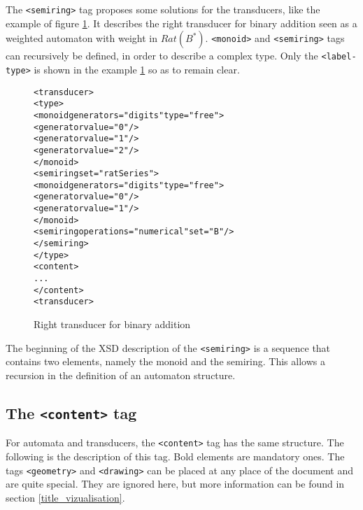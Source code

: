 \documentclass[a4paper]{article}
\def\typetag{\texttt{<label-type>}}
\def\contenttag{\texttt{<content>}}
\def\dstname{\texttt{dst}}
\def\srcname{\texttt{src}}
\def\geometrytag{\texttt{<geometry>}}
\def\drawingtag{\texttt{<drawing>}}
\def\monoidtag{\texttt{<monoid>}}
\def\semiringtag{\texttt{<semiring>}}
\begin{document}
The \semiringtag{} tag proposes some solutions for the transducers, like the
example of figure \ref{ratseries1}. It describes the right transducer
for binary addition seen as a weighted automaton with
weight in $Rat(B^*)$. \monoidtag{} and \semiringtag{} tags can recursively be
defined, in order to describe a complex type. Only the \typetag{} is shown in
the example \ref{ratseries1} so as to remain clear.

\begin{figure}[h]
  \begin{center}
\begin{alltt}
<transducer>
  <type>
    <monoid generators="digits" type="free">
      <generator value="0"/>
      <generator value="1"/>
      <generator value="2"/>
    </monoid>
    <semiring set="ratSeries">
      <monoid generators="digits" type="free">
        <generator value="0"/>
        <generator value="1"/>
      </monoid>
      <semiring operations="numerical" set="B"/>
    </semiring>
  </type>
  <content>
    ...
  </content>
<transducer>
\end{alltt}

\caption{Right transducer for binary addition}
\label{ratseries1}
  \end{center}
\end{figure}

The beginning of the XSD description of the \semiringtag{} is a sequence that
contains two elements, namely the monoid and the semiring. This allows a
recursion in the definition of an automaton structure.


\subsection{The \contenttag{} tag}

For automata and transducers, the \contenttag{} tag has the same structure.
The following is the description of this tag. Bold elements are mandatory ones.
The tags \geometrytag{} and \drawingtag{} can be placed at any
place of the document and are quite special. They are ignored here, but more
information can be found in section \ref{title_vizualisation}.\\\\
\end{document}
